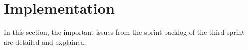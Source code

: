 \section{Implementation}
In this section, the important issues from the sprint backlog of the third sprint are detailed and explained.



